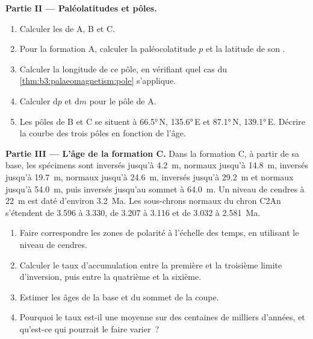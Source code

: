 \begin{problem}
\medskip\noindent\textbf{Partie II --- Paléolatitudes et pôles.}
\begin{enumerate}[resume]
  \item Calculer les  de A, B et C.
  \item Pour la formation A, calculer la paléocolatitude $p$ et la latitude de
        son .
  \item Calculer la longitude de ce pôle, en vérifiant quel cas du
        \cref{thm:b3:palaeomagnetism:pole} s'applique.
  \item Calculer $\mathrm dp$ et $\mathrm dm$ pour le pôle de A.
  \item Les pôles de B et C se situent à \ang{66.5}\,N, \ang{135.6}\,E et
        \ang{87.1}\,N, \ang{139.1}\,E. Décrire la courbe des trois pôles
        en fonction de l'âge.
\end{enumerate}

\medskip\noindent\textbf{Partie III --- L'âge de la formation C.} Dans la formation C,
à partir de sa base, les spécimens sont inversés jusqu'à \qty{4.2}{m}, normaux jusqu'à
\qty{14.8}{m}, inversés jusqu'à \qty{19.7}{m}, normaux jusqu'à \qty{24.6}{m}, inversés jusqu'à
\qty{29.2}{m} et normaux jusqu'à \qty{54.0}{m}, puis inversés jusqu'au sommet à
\qty{64.0}{m}. Un niveau de cendres à \qty{22}{m} est daté d'environ \qty{3.2}{Ma}. Les
sous-chrons normaux du chron C2An s'étendent de 3.596 à 3.330, de 3.207 à 3.116 et
de 3.032 à \qty{2.581}{Ma}.
\begin{enumerate}[resume]
  \item Faire correspondre les zones de polarité à l'échelle des temps, en utilisant le niveau de cendres.
  \item Calculer le taux d'accumulation entre la première et la troisième
        limite d'inversion, puis entre la quatrième et la sixième.
  \item Estimer les âges de la base et du sommet de la coupe.
  \item Pourquoi le taux est-il une moyenne sur des centaines de milliers d'années, et qu'est-ce qui
        pourrait le faire varier~?
\end{enumerate}


\end{problem}
